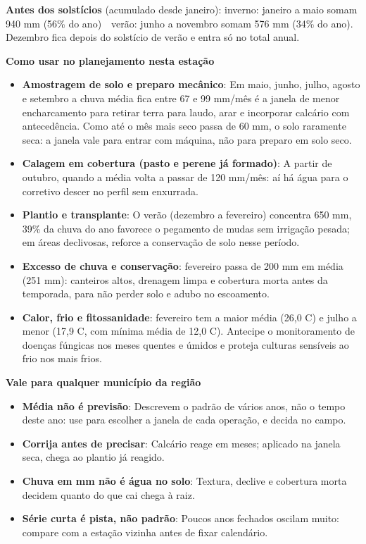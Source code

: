 \documentclass[10pt,a4paper]{article}
\begin{document}
\vspace{1pt}
{\footnotesize\textbf{Antes dos solstícios} (acumulado desde janeiro):
inverno: janeiro a maio somam 940 mm (56\% do ano) \,\textbullet\, verão: junho a novembro somam 576 mm (34\% do ano). Dezembro fica depois do solstício de verão e entra só no total
anual.}

\vspace{2pt}
{\bfseries\small Como usar no planejamento nesta estação}

\footnotesize\begin{itemize}\setlength{\itemsep}{0.5pt}
  \item \textbf{Amostragem de solo e preparo mecânico}: Em maio, junho, julho, agosto e setembro a chuva média fica entre 67 e 99 mm/mês \textemdash{} é a janela de menor encharcamento para retirar terra para laudo, arar e incorporar calcário com antecedência. Como até o mês mais seco passa de 60 mm, o solo raramente seca: a janela vale para entrar com máquina, não para preparo em solo seco.
  \item \textbf{Calagem em cobertura (pasto e perene já formado)}: A partir de outubro, quando a média volta a passar de 120 mm/mês: aí há água para o corretivo descer no perfil sem enxurrada.
  \item \textbf{Plantio e transplante}: O verão (dezembro a fevereiro) concentra 650 mm, 39\% da chuva do ano \textemdash{} favorece o pegamento de mudas sem irrigação pesada; em áreas declivosas, reforce a conservação de solo nesse período.
  \item \textbf{Excesso de chuva e conservação}: fevereiro passa de 200 mm em média (251 mm): canteiros altos, drenagem limpa e cobertura morta antes da temporada, para não perder solo e adubo no escoamento.
  \item \textbf{Calor, frio e fitossanidade}: fevereiro tem a maior média (26,0 \textdegree{}C) e julho a menor (17,9 \textdegree{}C, com mínima média de 12,0 \textdegree{}C). Antecipe o monitoramento de doenças fúngicas nos meses quentes e úmidos e proteja culturas sensíveis ao frio nos mais frios.
\end{itemize}

\vspace{1pt}
{\bfseries\small Vale para qualquer município da região}

\scriptsize\begin{itemize}\setlength{\itemsep}{0.5pt}
  \item \textbf{Média não é previsão}: Descrevem o padrão de vários anos, não o tempo deste ano: use para escolher a janela de cada operação, e decida no campo.
  \item \textbf{Corrija antes de precisar}: Calcário reage em meses; aplicado na janela seca, chega ao plantio já reagido.
  \item \textbf{Chuva em mm não é água no solo}: Textura, declive e cobertura morta decidem quanto do que cai chega à raiz.
  \item \textbf{Série curta é pista, não padrão}: Poucos anos fechados oscilam muito: compare com a estação vizinha antes de fixar calendário.
\end{itemize}
\end{document}
